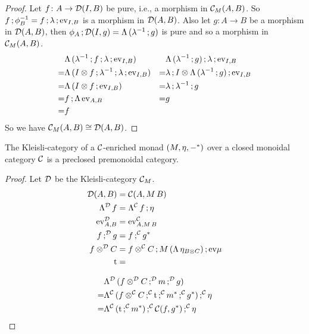 \documentclass[runningheads,envcountsame]{llncs}
\newcommand{\monad}{M}
\begin{document}
\begin{proof}
    Let $f\colon A \to \mathcal{D}(I, B)$ be pure, i.e., a morphism in $\C_\monad(A, B)$. So $\comp{f}{\phi_B^{-1}} = \comp{f}{\comp{\unitl}{\eval_{I, B}}}$ is a morphism in $\mathcal{D}(A, B)$. Also let $g\colon
    A \to B$ be a morphism in $\mathcal{D}(A, B)$, then $\comp{\phi_A}{\D(I, g)} = \curry\,(\comp{\unitl^{-1}}{g})$ is pure and so a morphism in $\C_\monad(A, B)$.
    \begin{align}
        & \curry\,(\comp{\unitl^{-1}}{\comp{f}{\comp{\unitl}{\eval_{I, B}}}}) &
        & \comp{\comp{\curry\,(\comp{\unitl^{-1}}{g})}{\unitl}}{\eval_{I,B}} \\
      = & \curry\,(\comp{\tensor{I}{f}}{\comp{\unitl^{-1}}{\comp{\unitl}{\eval_{I, B}}}}) &
      = & \comp{\comp{\unitl}{\tensor{I}{\curry\,(\comp{\unitl^{-1}}{g})}}}{\eval_{I,B}} \\
      = & \curry\,(\comp{\tensor{I}{f}}{\eval_{I, B}}) &
      = & \comp{\unitl}{\comp{\unitl^{-1}}{g}} \\
      = & \comp{f}{\curry\,\eval_{A, B}} &
      = & g \\
      = & f
    \end{align}
    So we have $\C_\monad(A, B) \cong \D(A, B)$.
\end{proof}

\begin{lemma}
    The Kleisli-category of a $\mathcal{C}$-enriched monad $(\monad, \munit, -^*)$ over a closed monoidal category $\mathcal{C}$ is a preclosed premonoidal category.
\end{lemma}
\begin{proof}
    Let $\mathcal{D}$ be the Kleisli-category $\C_\monad$.
    \begin{align}
        \D(A, B) &= \C(A, \monad\,B) \\
        \curry[\D]\,f &= \comp{\curry[\C]\,f}{\munit} \\
        \eval[\D]_{A,B} &= \eval[\C]_{A, \monad\,B} \\
        \comp[\D]{f}{g} &= \comp[\C]{f}{g^*} \\
        \tensor[\D]{f}{C} &= \comp{\tensor[\C]{f}{C}}{\comp{M\,(\curry\,\munit_{\tensor{B}{C}})}{\eval\mjoin}} \\
        \mstrength &= 
    \end{align}
    
    \begin{align}
        & \curry[\D]\,(\comp[\D]{\tensor[\D]{f}{C}}{\comp[\D]{m}{g}}) \\
      = & \comp[\C]{\curry[\C]\,(\comp[\C]{\comp[\C]{\tensor[\C]{f}{C}}{\mstrength}}{\comp[\C]{m^*}{g^*}})}{\munit} \\
      = & \comp[\C]{\comp[\C]{\curry[\C]\,(\comp[\C]{\mstrength}{m^*})}{\C(f, g^*)}}{\munit} \\
    \end{align}
\end{proof}
\end{document}
